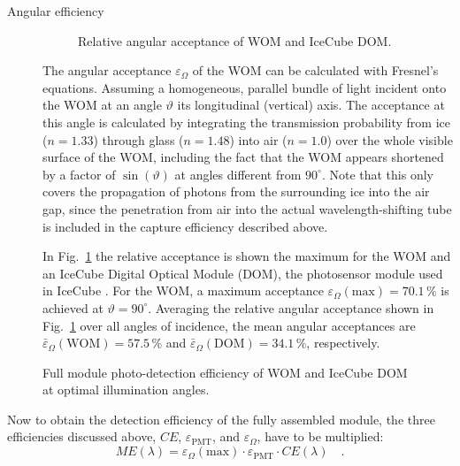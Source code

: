 \begin{description}
\item[Angular efficiency]
\begin{figure}[bht]
  \centering
  \caption{Relative angular acceptance of WOM and IceCube DOM.}
  \label{fig:angular_eff}
\end{figure}

The angular acceptance $\varepsilon_\Omega$ of the WOM can be calculated with 
Fresnel's equations. Assuming a homogeneous, parallel bundle of light incident 
onto the WOM at an angle $\vartheta$ \wrt its longitudinal (\ie vertical) axis. 
The acceptance at this angle is calculated by integrating the transmission 
probability from ice ($n=1.33$) through glass ($n=1.48$) into air ($n=1.0$) over 
the whole visible surface of the WOM, including the fact that the WOM appears 
shortened by a factor of $\sin(\vartheta)$ at angles different from $90^\circ$. 
Note that this only covers the propagation of photons from the surrounding ice 
into the air gap, since the penetration from air into the actual 
wavelength-shifting tube is included in the capture efficiency described above.

In Fig.~\ref{fig:angular_eff} the relative acceptance is shown \wrt the maximum 
for the WOM and an IceCube Digital Optical Module (DOM), the photosensor module 
used in IceCube \cite{ICdom}. For the WOM, a maximum acceptance 
$\varepsilon_\Omega(\mathrm{max}) = 70.1\,\%$ is achieved at 
$\vartheta=90^\circ$. Averaging the relative angular acceptance shown in 
Fig.~\ref{fig:angular_eff} over all angles of incidence, the mean angular 
acceptances are $\bar\varepsilon_\Omega(\mathrm{WOM}) = 57.5\,\%$ and 
$\bar\varepsilon_\Omega(\mathrm{DOM}) = 34.1\,\%$, respectively.

\end{description}

\begin{figure}[tbh]
  \centering
  \caption{Full module photo-detection efficiency of WOM and IceCube DOM at 
optimal illumination angles.}
  \label{fig:full_eff}
\end{figure}

Now to obtain the detection efficiency of the fully assembled module, the three 
efficiencies discussed above, $CE$, $\varepsilon_\mathrm{PMT}$, and 
$\varepsilon_\Omega$, have to be multiplied:
\begin{equation}
 ME(\lambda) = \varepsilon_\Omega(\mathrm{max}) \cdot \varepsilon_\mathrm{PMT} 
\cdot CE(\lambda)\quad.
\end{equation}

